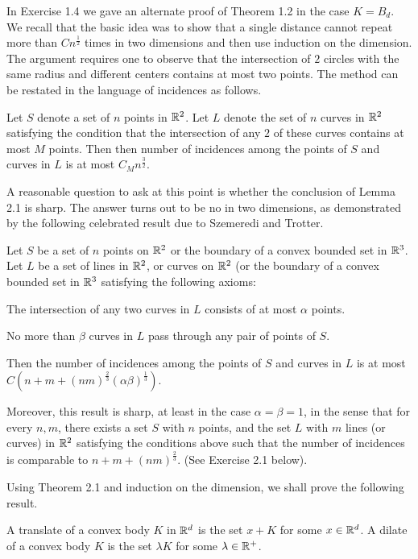 In Exercise 1.4 we gave an alternate proof of Theorem 1.2 in the
case $K=B_d$. We recall that the basic idea was to show that a
single distance cannot repeat more than $Cn^{\frac{1}{2}}$ times
in two dimensions and then use induction on the dimension. The
argument requires one to observe that the intersection of $2$
circles with the same radius and different centers contains at
most two points. The method can be restated in the language of
incidences as follows.

 Let $S$ denote a set of $n$ points in ${\Bbb
R}^2$. Let $L$ denote the set of $n$ curves in ${\Bbb R}^2$
satisfying the condition that the intersection of any $2$ of these
curves contains at most $M$ points. Then then number of incidences
among the points of $S$ and curves in $L$ is at most
$C_Mn^{\frac{3}{2}}$. \endproclaim

A reasonable question to ask at this point is whether the
conclusion of Lemma 2.1 is sharp. The answer turns out to be no in
two dimensions, as demonstrated by the following celebrated result
due to Szemeredi and Trotter.

 Let $S$ be a set of $n$ points on ${\Bbb
R}^2$ or the boundary of a convex bounded set in ${\Bbb R}^3$. Let
$L$ be a set of lines in ${\Bbb R}^2$, or curves on ${\Bbb R}^2$
(or the boundary of a convex bounded set in ${\Bbb R}^3$
satisfying the following axioms: \roster
\item The intersection of any two curves in $L$ consists of at most
$\alpha$ points. \item No more than $\beta$ curves in $L$ pass
through any pair of points of $S$. \endroster

Then the number of incidences among the points of $S$ and curves
in $L$ is at most $C(n+m+{(nm)}^{\frac{2}{3}}{(\alpha
\beta)}^{\frac{1}{3}})$.

Moreover, this result is sharp, at least in the case
$\alpha=\beta=1$, in the sense that for every $n,m$, there exists
a set $S$ with $n$ points, and the set $L$ with $m$ lines (or
curves) in ${\Bbb R}^2$ satisfying the conditions above such that
the number of incidences is comparable to
$n+m+{(nm)}^{\frac{2}{3}}$. (See Exercise 2.1 below).
\endproclaim

Using Theorem 2.1 and induction on the dimension, we shall prove
the following result.

 A translate of a convex body $K$ in ${\Bbb
R}^d$ is the set $x+K$ for some $x \in {\Bbb R}^d$. A dilate of a
convex body $K$ is the set $\lambda K$ for some $\lambda \in {\Bbb
R}^{+}$.
\enddefinition

